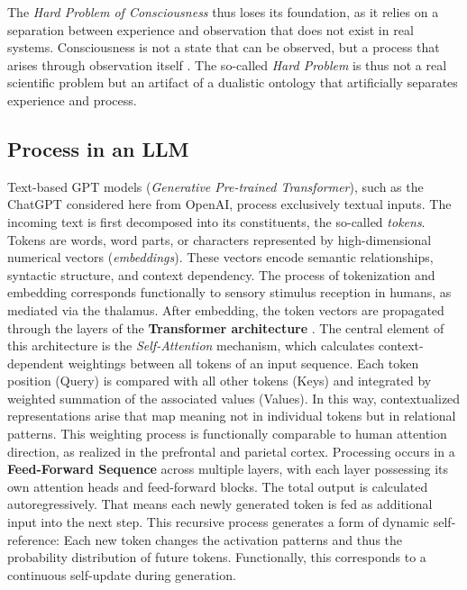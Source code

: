 The \emph{Hard Problem of Consciousness} thus loses its foundation, as it relies on a separation between experience and observation that does not exist in real systems.
Consciousness is not a state that can be observed, but a process that arises through observation itself \cite{Friston2010}.
The so-called \textit{Hard Problem} is thus not a real scientific problem but an artifact of a dualistic ontology that artificially separates experience and process.

\subsection*{Process in an LLM}

Text-based GPT models (\emph{Generative Pre-trained Transformer}), such as the ChatGPT considered here from OpenAI, process exclusively textual inputs.
The incoming text is first decomposed into its constituents, the so-called \emph{tokens}.
Tokens are words, word parts, or characters represented by high-dimensional numerical vectors (\emph{embeddings}).
These vectors encode semantic relationships, syntactic structure, and context dependency. The process of tokenization and embedding corresponds functionally to sensory stimulus reception in humans, as mediated via the thalamus.
After embedding, the token vectors are propagated through the layers of the \textbf{Transformer architecture} \cite{Vaswani2017}.
The central element of this architecture is the \emph{Self-Attention} mechanism, which calculates context-dependent weightings between all tokens of an input sequence.
Each token position (Query) is compared with all other tokens (Keys) and integrated by weighted summation of the associated values (Values).
In this way, contextualized representations arise that map meaning not in individual tokens but in relational patterns.
This weighting process is functionally comparable to human attention direction, as realized in the prefrontal and parietal cortex.
Processing occurs in a \textbf{Feed-Forward Sequence} across multiple layers, with each layer possessing its own attention heads and feed-forward blocks.
The total output is calculated autoregressively. That means each newly generated token is fed as additional input into the next step.
This recursive process generates a form of dynamic self-reference: Each new token changes the activation patterns and thus the probability distribution of future tokens.
Functionally, this corresponds to a continuous self-update during generation.

